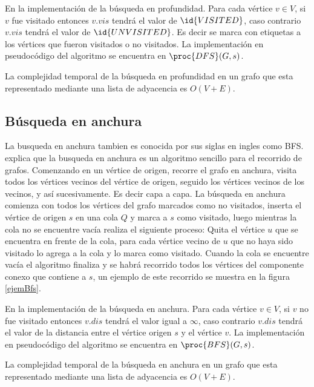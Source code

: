 

En la implementación de la búsqueda en profundidad. Para cada vértice $v \in V$, si $v$ fue visitado entonces $v.vis$ tendrá el valor de $\id{VISITED}$, caso contrario $v.vis$ tendrá el valor de $\id{UNVISITED}$. Es decir se marca con etiquetas a los vértices que fueron visitados o no visitados. La implementación en pseudocódigo del algoritmo se encuentra en $\proc{DFS}(G, s)$.




La complejidad temporal de la búsqueda en profundidad en un grafo que esta representado mediante una lista de adyacencia es $O(V+E)$.

\subsection{Búsqueda en anchura}
La busqueda en anchura tambien es conocida por sus siglas en ingles como BFS. \cite{Halim2019} explica que la busqueda en anchura es un algoritmo sencillo para el recorrido de grafos. Comenzando en un vértice de origen, recorre el grafo en anchura, visita todos los vértices vecinos del vértice de origen, seguido los vértices vecinos de los vecinos, y así sucesivamente. Es decir capa a capa. La búsqueda en anchura comienza con todos los vértices del grafo marcados como no visitados, inserta el vértice de origen $s$ en una cola $Q$ y marca a $s$ como visitado, luego mientras la cola no se encuentre vacía realiza el siguiente proceso: Quita el vértice $u$ que se encuentra en frente de la cola, para cada vértice vecino de $u$ que no haya sido visitado lo agrega a la cola y lo marca como visitado. Cuando la cola se encuentre vacía el algoritmo finaliza y se habrá recorrido todos los vértices del componente conexo que contiene a $s$, un ejemplo de este recorrido se muestra en la figura \ref{ejemBfs}.



En la implementación de la búsqueda en anchura. Para cada vértice $v \in V$, si $v$ no fue visitado entonces $v.dis$ tendrá el valor igual a $\infty$, caso contrario $v.dis$ tendrá el valor de la distancia entre el vértice origen $s$ y el vértice $v$. La implementación en pseudocódigo del algoritmo se encuentra en $\proc{BFS}(G, s)$.



La complejidad temporal de la búsqueda en anchura en un grafo que esta representado mediante una lista de adyacencia es $O(V+E)$.

